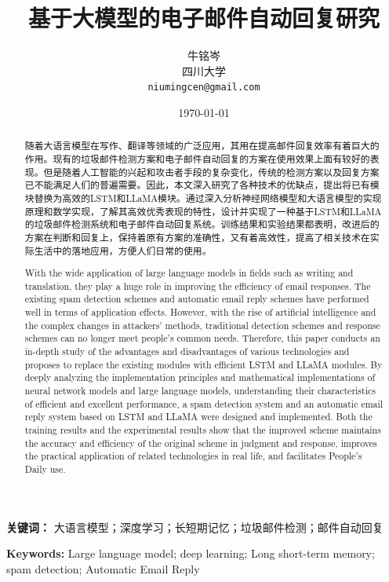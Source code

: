 \documentclass[12pt, a4paper]{article}
\title{基于大模型的电子邮件自动回复研究}
\author{牛铭岑\\ 四川大学 \\ \texttt{niumingcen@gmail.com}}
\date{\today}
\begin{document}
\maketitle
\newpage 
\begin{abstract}
随着大语言模型在写作、翻译等领域的广泛应用，其用在提高邮件回复效率有着巨大的作用。现有的垃圾邮件检测方案和电子邮件自动回复的方案在使用效果上面有较好的表现。但是随着人工智能的兴起和攻击者手段的复杂变化，传统的检测方案以及回复方案已不能满足人们的普遍需要。因此，本文深入研究了各种技术的优缺点，提出将已有模块替换为高效的LSTM和LLaMA模块。通过深入分析神经网络模型和大语言模型的实现原理和数学实现，了解其高效优秀表现的特性，设计并实现了一种基于LSTM和LLaMA的垃圾邮件检测系统和电子邮件自动回复系统。训练结果和实验结果都表明，改进后的方案在判断和回复上，保持着原有方案的准确性，又有着高效性，提高了相关技术在实际生活中的落地应用，方便人们日常的使用。
\end{abstract}
\textbf{关键词：} 大语言模型；深度学习；长短期记忆；垃圾邮件检测；邮件自动回复

\newpage 
\vspace{10pt}
\renewcommand{\abstractname}{Abstract} %
\begin{abstract}
With the wide application of large language models in fields such as writing and translation, they play a huge role in improving the efficiency of email responses. The existing spam detection schemes and automatic email reply schemes have performed well in terms of application effects. However, with the rise of artificial intelligence and the complex changes in attackers' methods, traditional detection schemes and response schemes can no longer meet people's common needs. Therefore, this paper conducts an in-depth study of the advantages and disadvantages of various technologies and proposes to replace the existing modules with efficient LSTM and LLaMA modules. By deeply analyzing the implementation principles and mathematical implementations of neural network models and large language models, understanding their characteristics of efficient and excellent performance, a spam detection system and an automatic email reply system based on LSTM and LLaMA were designed and implemented. Both the training results and the experimental results show that the improved scheme maintains the accuracy and efficiency of the original scheme in judgment and response, improves the practical application of related technologies in real life, and facilitates People's Daily use.
\end{abstract}
\textbf{Keywords:} Large language model; deep learning; Long short-term memory; spam detection; Automatic Email Reply
\newpage 
\tableofcontents   %
\newpage
\end{document}
